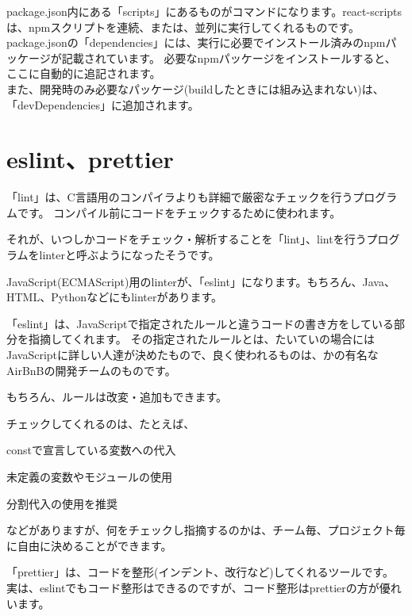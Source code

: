 package.json内にある「scripts」にあるものがコマンドになります。react{-}scriptsは、npmスクリプトを連続、または、並列に実行してくれるものです。
\\[0pt]

package.jsonの「dependencies」には、実行に必要でインストール済みのnpmパッケージが記載されています。
必要なnpmパッケージをインストールすると、ここに自動的に追記されます。
\\[0pt]
また、開発時のみ必要なパッケージ(buildしたときには組み込まれない)は、「devDependencies」に追加されます。
\\[0pt]

\section{eslint、prettier}
\keeplastskip{
  \label{sec:2-4}
  \label{sec-03lint}
  \par\nobreak
}

「lint」は、C言語用のコンパイラよりも詳細で厳密なチェックを行うプログラムです。
コンパイル前にコードをチェックするために使われます。

それが、いつしかコードをチェック・解析することを「lint」、lintを行うプログラムをlinterと呼ぶようになったそうです。

JavaScript(ECMAScript)用のlinterが、「eslint」になります。もちろん、Java、HTML、Pythonなどにもlinterがあります。

「eslint」は、JavaScriptで指定されたルールと違うコードの書き方をしている部分を指摘してくれます。
その指定されたルールとは、たいていの場合にはJavaScriptに詳しい人達が決めたもので、良く使われるものは、かの有名なAirBnBの開発チームのものです。

もちろん、ルールは改変・追加もできます。

チェックしてくれるのは、たとえば、\\[0pt]

\begin{starteritemize}
\item constで宣言している変数への代入
\item 未定義の変数やモジュールの使用
\item 分割代入の使用を推奨
\end{starteritemize}

などがありますが、何をチェックし指摘するのかは、チーム毎、プロジェクト毎に自由に決めることができます。

「prettier」は、コードを整形(インデント、改行など)してくれるツールです。
実は、eslintでもコード整形はできるのですが、コード整形はprettierの方が優れいます。

